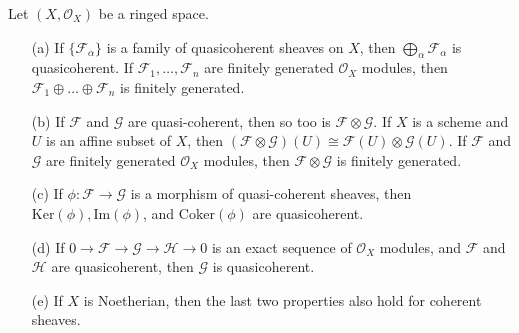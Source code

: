 \begin{lemma}
    Let $(X,\mathcal{O}_X)$ be a ringed space.
    \begin{enumerate}
        \item[(a)] If $\{ \mathcal{F}_\alpha \}$ is a family of quasicoherent sheaves on $X$, then $\bigoplus_\alpha \mathcal{F}_\alpha$ is quasicoherent. If $\mathcal{F}_1,\dots,\mathcal{F}_n$ are finitely generated $\mathcal{O}_X$ modules, then $\mathcal{F}_1 \oplus \dots \oplus \mathcal{F}_n$ is finitely generated.

        \item[(b)] If $\mathcal{F}$ and $\mathcal{G}$ are quasi-coherent, then so too is $\mathcal{F} \otimes \mathcal{G}$. If $X$ is a scheme and $U$ is an affine subset of $X$, then $(\mathcal{F} \otimes \mathcal{G})(U) \cong \mathcal{F}(U) \otimes \mathcal{G}(U)$. If $\mathcal{F}$ and $\mathcal{G}$ are finitely generated $\mathcal{O}_X$ modules, then $\mathcal{F} \otimes \mathcal{G}$ is finitely generated.
        \item[(c)] If $\phi: \mathcal{F} \to \mathcal{G}$ is a morphism of quasi-coherent sheaves, then $\text{Ker}(\phi), \text{Im}(\phi)$, and $\text{Coker}(\phi)$ are quasicoherent.
        \item[(d)] If $0 \to \mathcal{F} \to \mathcal{G} \to \mathcal{H} \to 0$ is an exact sequence of $\mathcal{O}_X$ modules, and $\mathcal{F}$ and $\mathcal{H}$ are quasicoherent, then $\mathcal{G}$ is quasicoherent.
        \item[(e)] If $X$ is Noetherian, then the last two properties also hold for coherent sheaves.
    \end{enumerate}
\end{lemma}
